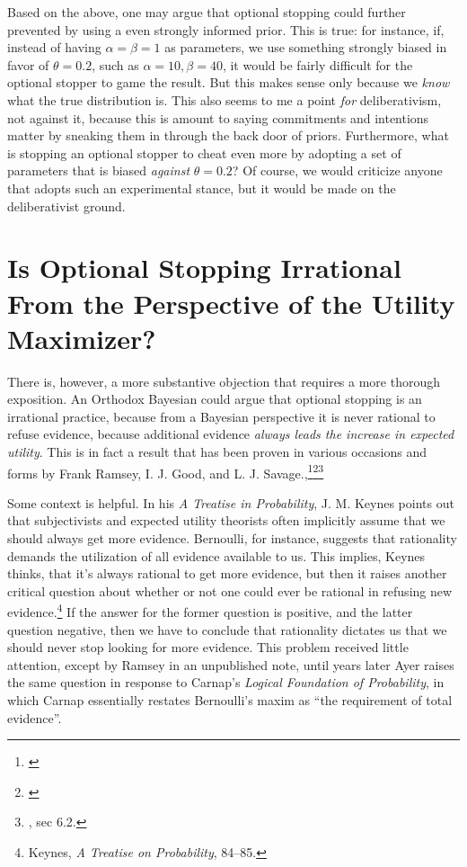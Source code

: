 Based on the above, one may argue that optional stopping could further prevented by using a even strongly informed prior. This is true: for instance, if, instead of
having \(\alpha = \beta = 1\) as parameters, we use something strongly
biased in favor of \(\theta = 0.2\), such as
\(\alpha = 10, \beta = 40\), it would be fairly difficult for the
optional stopper to game the result. But this makes sense only because we \emph{know} what the true distribution is. This also seems to me a point
\emph{for} deliberativism, not against it, because this is amount to
saying commitments and intentions matter by sneaking them in through the
back door of priors. Furthermore, what is stopping an optional stopper
to cheat even more by adopting a set of parameters that is biased
\emph{against} \(\theta = 0.2\)? Of course, we would criticize anyone
that adopts such an experimental stance, but it would be made on the
deliberativist ground.

\hypertarget{is-optional-stopping-irrational-from-the-perspective-of-the-utility-maximizer}{%
\section{Is Optional Stopping Irrational From the Perspective of the
Utility
Maximizer?}\label{is-optional-stopping-irrational-from-the-perspective-of-the-utility-maximizer}}

There is, however, a more substantive objection that requires a more
thorough exposition. An Orthodox Bayesian could argue that optional
stopping is an irrational practice, because from a Bayesian perspective
it is never rational to refuse evidence, because additional evidence
\emph{always leads the increase in expected utility}. This is in fact a
result that has been proven in various occasions and forms by Frank
Ramsey, I. J. Good, and L. J. Savage.,\footnote{\cite{ramseyvalue}}\footnote{\cite{goodtotalevidence}}\footnote{\cite{savage}, sec 6.2.}

Some context is helpful. In his \emph{A Treatise in Probability}, J. M.
Keynes points out that subjectivists and expected utility theorists
often implicitly assume that we should always get more evidence.
Bernoulli, for instance, suggests that rationality demands the
utilization of all evidence available to us. This implies, Keynes
thinks, that it's always rational to get more evidence, but then it
raises another critical question about whether or not one could ever be
rational in refusing new evidence.\footnote{Keynes, \emph{A Treatise on
  Probability}, 84--85.} If the answer for the former question is
positive, and the latter question negative, then we have to conclude
that rationality dictates us that we should never stop looking for more
evidence. This problem received little attention, except by Ramsey in an
unpublished note, until years later Ayer raises the same question in
response to Carnap's \emph{Logical Foundation of Probability}, in which
Carnap essentially restates Bernoulli's maxim as ``the requirement of
total evidence''.

